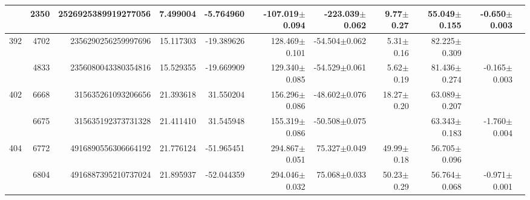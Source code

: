 \documentclass{ws-ijmpd}
\begin{document}
\begin{landscape}
\begin{longtable}{rrrrrrrrrrl}
            &    2350 &      2526925389919277056 &                     7.499004 &                    -5.764960 &               -107.019$\pm$0.094 &               -223.039$\pm$0.062 &           9.77$\pm$  0.27 &        55.049$\pm$0.155 &                          -0.650$\pm$0.003 &                                                    \\
 \hline 392 &    4702 &      2356290256259997696 &                    15.117303 &                   -19.389626 &                128.469$\pm$0.101 &                -54.504$\pm$0.062 &           5.31$\pm$  0.16 &        82.225$\pm$0.309 &                                           &                                                    \\
            &    4833 &      2356080043380354816 &                    15.529355 &                   -19.669909 &                129.340$\pm$0.085 &                -54.529$\pm$0.061 &           5.62$\pm$  0.19 &        81.436$\pm$0.274 &                          -0.165$\pm$0.003 &                                                    \\
 \hline 402 &    6668 &       315635261093206656 &                    21.393618 &                    31.550204 &                156.296$\pm$0.086 &                -48.602$\pm$0.076 &          18.27$\pm$  0.20 &        63.089$\pm$0.207 &                                           &                                                    \\
            &    6675 &       315635192373731328 &                    21.411410 &                    31.545948 &                155.319$\pm$0.086 &                -50.508$\pm$0.075 &                           &        63.343$\pm$0.183 &                          -1.760$\pm$0.004 &                                                    \\
 \hline 404 &    6772 &      4916890556306664192 &                    21.776124 &                   -51.965451 &                294.867$\pm$0.051 &                 75.327$\pm$0.049 &          49.99$\pm$  0.18 &        56.705$\pm$0.096 &                                           &                                                    \\
            &    6804 &      4916887395210737024 &                    21.895937 &                   -52.044359 &                294.046$\pm$0.032 &                 75.068$\pm$0.033 &          50.23$\pm$  0.29 &        56.764$\pm$0.068 &                          -0.971$\pm$0.001 &                                                    \\

\end{longtable}
\end{landscape}
\end{document}
